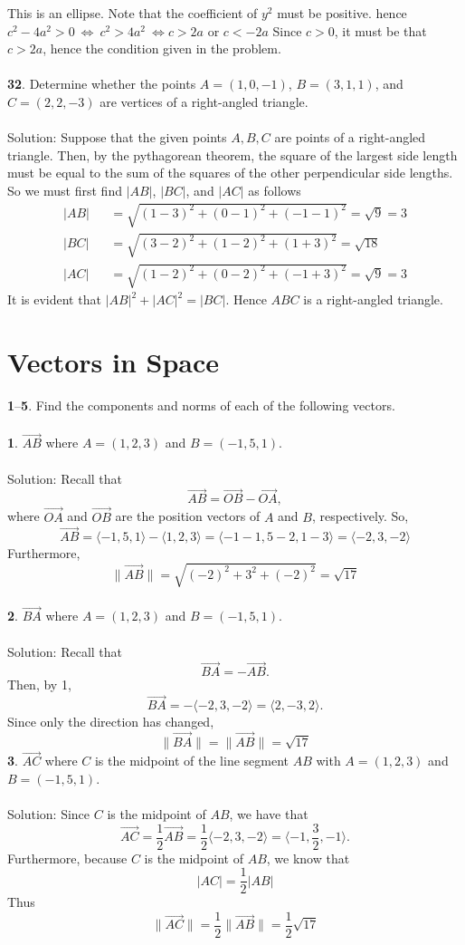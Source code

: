 \documentclass[12pt]{amsbook}
\newcommand{\la}{\langle}
\newcommand{\ra}{\rangle}
\begin{document}
This is an ellipse. Note that the coefficient of $y^2$ must be positive. hence $c^2-4a^2>0 \ \Leftrightarrow \ c^2>4a^2 \ \Leftrightarrow c>2a$ or $c<-2a$ Since $c>0$, it must be that $c>2a$, hence the condition given in the problem.
\\
\\
{\small\bf 32}. Determine whether the points $A=(1,0,-1)$, $B=(3,1,1)$, and 
$C=(2,2,-3)$ are vertices of a right-angled triangle.
\\
\\
{\sc Solution}:
Suppose that the given points $A,B,C$ are points of a right-angled triangle. Then, by the pythagorean theorem, the square of the largest side length must be equal to the sum of the squares of the other perpendicular side lengths. So we must first find $|AB|$, $|BC|$, and $|AC|$ as follows
\begin{eqnarray*}
|AB|&&=\sqrt{(1-3)^2+(0-1)^2+(-1-1)^2}=\sqrt{9}=3 \\
|BC|&&=\sqrt{(3-2)^2+(1-2)^2+(1+3)^2}=\sqrt{18} \\
|AC|&&=\sqrt{(1-2)^2+(0-2)^2+(-1+3)^2}=\sqrt{9}=3
\end{eqnarray*}
It is evident that $|AB|^2+|AC|^2=|BC|$. Hence $ABC$ is a right-angled triangle.

\newpage
\section{Vectors in Space}
\noindent
{\small \bf 1}--{\small\bf 5}. Find the
  components and norms of each of the following vectors.
\\
\\
{\small\bf 1}.  $\overrightarrow{AB}$ where $A=(1,2,3)$ and
$B=(-1,5,1)$.\\
\\
{\sc Solution}: Recall that $$
\overrightarrow{AB} = \overrightarrow{OB} -\overrightarrow{OA}, $$ where $\overrightarrow{OA}$ and $\overrightarrow{OB}$ are the position vectors of $A$ and $B$, respectively. 
So,
$$\overrightarrow{AB} =  \la -1,5,1 \ra - \la 1,2,3 \ra = \la -1-1,5-2,1-3 \ra = \la -2,3,-2 \ra $$
Furthermore, $$\|\overrightarrow{AB}\|=\sqrt{(-2)^2+3^2+(-2)^2}=\sqrt{17}$$
\\
{\small\bf 2}.  $\overrightarrow{BA}$ where $A=(1,2,3)$ and
$B=(-1,5,1)$.\\
\\
{\sc Solution}: Recall that $$\overrightarrow{BA} = -\overrightarrow{AB}.$$ Then, by 1, $$\overrightarrow{BA}=-\la -2,3,-2\ra = \la 2,-3,2 \ra.$$ Since only the direction has changed, $$\|\overrightarrow{BA}\|=\|\overrightarrow{AB}\|=\sqrt{17}$$
{\small\bf 3}. $\overrightarrow{AC}$ where
$C$  is the midpoint of the line segment $AB$
with $A=(1,2,3)$ and $B=(-1,5,1)$.\\
\\
{\sc Solution}: Since $C$ is the midpoint of $AB$, we have that $$\overrightarrow{AC}=\frac 12\overrightarrow{AB}=\frac{1}{2} \la -2, 3, -2 \ra = \la -1, \frac{3}{2}, -1 \ra.$$ Furthermore, because $C$ is the midpoint of $AB$, we know that $$|AC|=\frac 12|AB|$$ Thus $$\|\overrightarrow{AC}\|=\frac 12\|\overrightarrow{AB}\|=\frac 12\sqrt{17}$$
\end{document}
